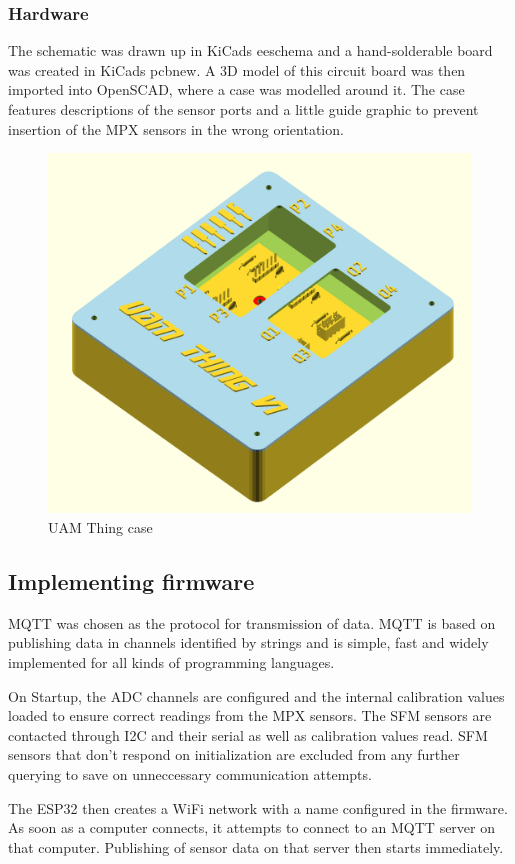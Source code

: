 \documentclass[MME,Projekt,english]{twbook}%
\begin{document}
\subsubsection{Hardware}

The schematic was drawn up in KiCads eeschema and a hand-solderable board was created in KiCads pcbnew. A 3D model of this
circuit board was then imported into OpenSCAD, where a case was modelled around it. The case features descriptions of the sensor ports
and a little guide graphic to prevent insertion of the MPX sensors in the wrong orientation.

\begin{figure}[!htbp]
	\centering
	\includegraphics[width=.5\linewidth]{images/uam-thing-case.png}
	\caption{UAM Thing case}\label{uam-thing-case}
\end{figure}

\subsection{Implementing firmware}

MQTT was chosen as the protocol for transmission of data. MQTT is based on publishing data in channels identified by strings and
is simple, fast and widely implemented for all kinds of programming languages.

On Startup, the ADC channels are configured and the internal calibration values loaded to ensure correct readings from the MPX sensors.
The SFM sensors are contacted through I2C and their serial as well as calibration values read. SFM sensors that don't respond on
initialization are excluded from any further querying to save on unneccessary communication attempts.

The ESP32 then creates a WiFi network with a name configured in the firmware. As soon as a computer connects, it attempts
to connect to an MQTT server on that computer. Publishing of sensor data on that server then starts immediately.
\end{document}
